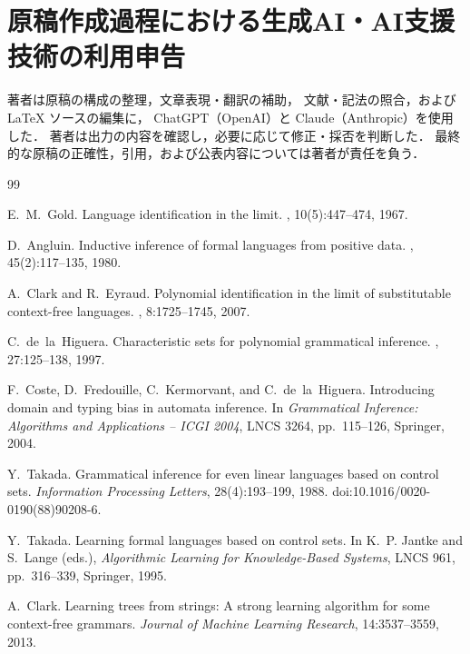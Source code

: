 \documentclass[11pt,a4paper]{ltjsarticle}
\numberwithin{equation}{section}
\theoremstyle{plain}
\theoremstyle{definition}
\theoremstyle{remark}
\begin{document}
\section*{原稿作成過程における生成AI・AI支援技術の利用申告}
著者は原稿の構成の整理，文章表現・翻訳の補助，
文献・記法の照合，および \LaTeX{} ソースの編集に，
ChatGPT（OpenAI）と Claude（Anthropic）を使用した．
著者は出力の内容を確認し，必要に応じて修正・採否を判断した．
最終的な原稿の正確性，引用，および公表内容については著者が責任を負う．

\small
\begin{thebibliography}{99}

E.~M.~Gold.
\newblock Language identification in the limit.
, 10(5):447--474, 1967.

D.~Angluin.
\newblock Inductive inference of formal languages from positive data.
, 45(2):117--135, 1980.

A.~Clark and R.~Eyraud.
\newblock Polynomial identification in the limit of substitutable context-free
languages.
, 8:1725--1745, 2007.

C.~de~la~Higuera.
\newblock Characteristic sets for polynomial grammatical inference.
, 27:125--138, 1997.

F.~Coste, D.~Fredouille, C.~Kermorvant, and C.~de~la~Higuera.
\newblock Introducing domain and typing bias in automata inference.
\newblock In \emph{Grammatical Inference: Algorithms and Applications -- ICGI 2004},
LNCS 3264, pp.~115--126, Springer, 2004.

Y.~Takada.
\newblock Grammatical inference for even linear languages based on control sets.
\newblock \emph{Information Processing Letters}, 28(4):193--199, 1988.
\newblock doi:10.1016/0020-0190(88)90208-6.

Y.~Takada.
\newblock Learning formal languages based on control sets.
\newblock In K.~P. Jantke and S.~Lange (eds.), \emph{Algorithmic Learning
for Knowledge-Based Systems}, LNCS 961, pp.~316--339, Springer, 1995.

A.~Clark.
\newblock Learning trees from strings: A strong learning algorithm for some context-free grammars.
\newblock \emph{Journal of Machine Learning Research}, 14:3537--3559, 2013.


\end{thebibliography}
\end{document}
